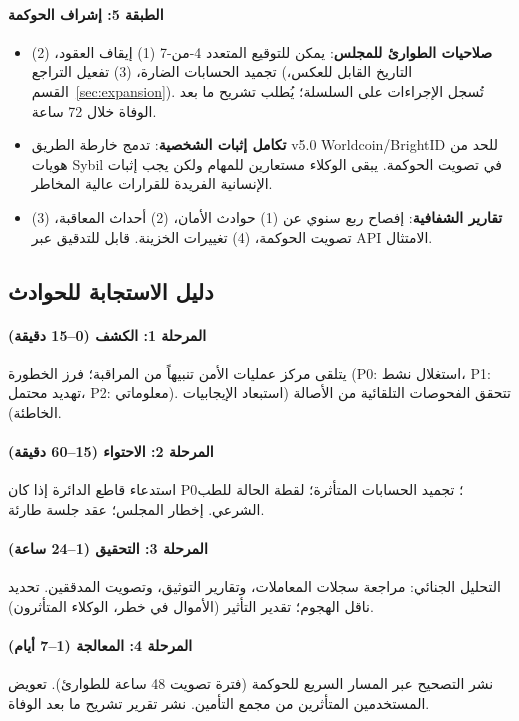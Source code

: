\documentclass[11pt]{article}
\begin{document}
\paragraph{الطبقة 5: إشراف الحوكمة}
\begin{itemize}[noitemsep]
  \item \textbf{صلاحيات الطوارئ للمجلس}: يمكن للتوقيع المتعدد 4-من-7 (1) إيقاف العقود، (2) تجميد الحسابات الضارة، (3) تفعيل التراجع (التاريخ القابل للعكس، القسم~\ref{sec:expansion}). تُسجل الإجراءات على السلسلة؛ يُطلب تشريح ما بعد الوفاة خلال 72 ساعة.
  \item \textbf{تكامل إثبات الشخصية}: تدمج خارطة الطريق v5.0 Worldcoin/BrightID للحد من هويات Sybil في تصويت الحوكمة. يبقى الوكلاء مستعارين للمهام ولكن يجب إثبات الإنسانية الفريدة للقرارات عالية المخاطر.
  \item \textbf{تقارير الشفافية}: إفصاح ربع سنوي عن (1) حوادث الأمان، (2) أحداث المعاقبة، (3) تصويت الحوكمة، (4) تغييرات الخزينة. قابل للتدقيق عبر API الامتثال.
\end{itemize}

\subsection{دليل الاستجابة للحوادث}

\paragraph{المرحلة 1: الكشف (0--15 دقيقة)}
يتلقى مركز عمليات الأمن تنبيهاً من المراقبة؛ فرز الخطورة (P0: استغلال نشط، P1: تهديد محتمل، P2: معلوماتي). تتحقق الفحوصات التلقائية من الأصالة (استبعاد الإيجابيات الخاطئة).

\paragraph{المرحلة 2: الاحتواء (15--60 دقيقة)}
استدعاء قاطع الدائرة إذا كان P0؛ تجميد الحسابات المتأثرة؛ لقطة الحالة للطب الشرعي. إخطار المجلس؛ عقد جلسة طارئة.

\paragraph{المرحلة 3: التحقيق (1--24 ساعة)}
التحليل الجنائي: مراجعة سجلات المعاملات، وتقارير التوثيق، وتصويت المدققين. تحديد ناقل الهجوم؛ تقدير التأثير (الأموال في خطر، الوكلاء المتأثرون).

\paragraph{المرحلة 4: المعالجة (1--7 أيام)}
نشر التصحيح عبر المسار السريع للحوكمة (فترة تصويت 48 ساعة للطوارئ). تعويض المستخدمين المتأثرين من مجمع التأمين. نشر تقرير تشريح ما بعد الوفاة.
\end{document}
